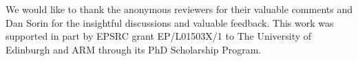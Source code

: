 \begin{acks}
 We would like to thank the anonymous reviewers for their valuable comments and Dan Sorin for the insightful discussions and valuable feedback.
 This work was supported in part by EPSRC grant EP/L01503X/1 to The University of Edinburgh and ARM through its PhD Scholarship Program.
\end{acks}